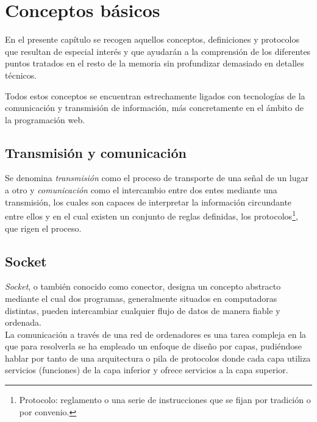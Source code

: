 


\chapter{Conceptos básicos}
\label{chap:conceptos-básicos}


En el presente capítulo se recogen aquellos conceptos, definiciones y protocolos que resultan de especial interés y que ayudarán a la comprensión de los diferentes puntos tratados en el resto de 
la memoria sin profundizar demasiado en detalles técnicos.

Todos estos conceptos se encuentran estrechamente ligados con tecnologías de la comunicación y transmisión de información, más concretamente en el ámbito de la programación web.

\section{Transmisión y comunicación}
\label{sec:transmisión}

Se denomina \emph{transmisión} como el proceso de transporte de una señal de un lugar a otro y \emph{comunicación} como el intercambio entre dos entes mediante una transmisión, los cuales son capaces de
interpretar la información circundante entre ellos y en el cual existen un conjunto de reglas definidas, los protocolos\footnote{Protocolo: reglamento o una serie de instrucciones que se fijan por tradición o por convenio. },
que rigen el proceso.


\section{Socket}
\label{sec:def-socket}

\emph{Socket}, o también conocido como conector, designa un concepto abstracto mediante el cual dos programas, generalmente situados en computadoras distintas, pueden intercambiar cualquier flujo de datos
de manera fiable y ordenada.\\

La comunicación a través de una red de ordenadores es una tarea compleja en la que para resolverla se ha empleado un enfoque de diseño por capas, pudiéndose hablar por tanto de una arquitectura 
o pila de protocolos donde cada capa utiliza servicios (funciones) de la capa inferior y ofrece servicios a la capa superior. \\

